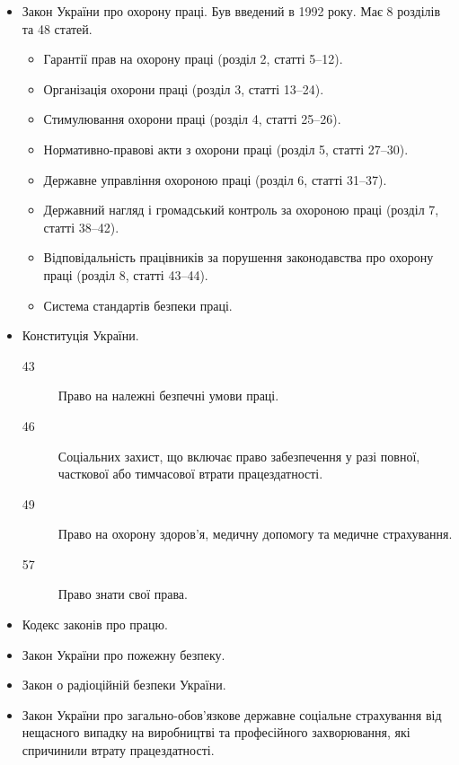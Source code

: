 \documentclass[a4paper,10pt,notitlepage,pdftex,headsepline]{scrartcl}
\begin{document}
  \begin{itemize}
    \item Закон України про охорону праці.
      Був введений в 1992 року.
      Має 8 розділів та 48 статей.
      \begin{itemize}
        \item Гарантії прав на охорону праці (розділ 2, статті 5--12).
        \item Організація охорони праці (розділ 3, статті 13--24).
        \item Стимулювання охорони праці (розділ 4, статті 25--26).
        \item Нормативно-правові акти з охорони праці (розділ 5, статті
          27--30).
        \item Державне управління охороною праці (розділ 6, статті 31--37).
        \item Державний нагляд і громадський контроль за охороною праці
          (розділ 7, статті 38--42).
        \item Відповідальність працівників за порушення законодавства про
          охорону праці (розділ 8, статті 43--44).
        \item Система стандартів безпеки праці.
      \end{itemize}
    \item Конституція України.
      \begin{description}
        \item[43] Право на належні безпечні умови праці.
        \item[46] Соціальних захист, що включає право забезпечення у разі
          повної, часткової або тимчасової втрати працездатності.
        \item[49] Право на охорону здоров’я, медичну допомогу та медичне
          страхування.
        \item[57] Право знати свої права.
      \end{description}
    \item Кодекс законів про працю.
    \item Закон України про пожежну безпеку.
    \item Закон о радіоційній безпеки України.
    \item Закон України про загально-обов’язкове державне соціальне страхування
      від нещасного випадку на виробництві та професійного захворювання, які
      спричинили втрату працездатності.
  \end{itemize}
\end{document}
